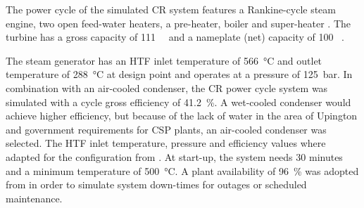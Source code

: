 The power cycle of the simulated \ac{CR} system features a Rankine-cycle steam engine, two open feed-water heaters, a pre-heater, boiler and super-heater \cite{NREL2015a}. The turbine has a gross capacity of \SI{111}{\mega\wattel} and a nameplate (net) capacity of 100 \si{\mega\wattel}. 


The steam generator has an \ac{HTF} inlet temperature of \SI{566}{\celsius} and outlet temperature of \SI{288}{\celsius} at design point and operates at a pressure of \SI{125}{\bar}. In combination with an air-cooled condenser, the \ac{CR} power cycle system was simulated with a cycle gross efficiency of \SI{41.2}{\percent}. A wet-cooled condenser would achieve higher efficiency, but because of the lack of water in the area of Upington and government requirements for \ac{CSP} plants, an air-cooled condenser was selected. The \ac{HTF} inlet temperature, pressure and efficiency values where adapted for the configuration from \cite{Kolb2011a}. At start-up, the system needs 30 minutes and a minimum temperature of \SI{500}{\celsius}. A plant availability of \SI{96}{\percent} was adopted from \cite{Morin2012} in order to simulate system down-times for outages or scheduled maintenance.

